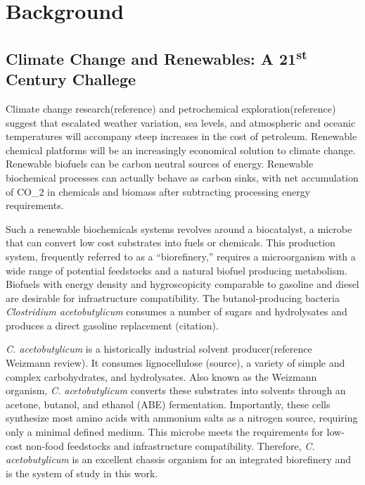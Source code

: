 
\chapter{Background}

\section{Climate Change and Renewables: A 21\textsuperscript{st} Century Challege}
Climate change research(reference) and petrochemical exploration(reference) suggest that escalated weather variation, sea levels, and atmospheric and oceanic temperatures will accompany steep increases in the cost of petroleum. Renewable chemical platforms will be an increasingly economical solution to climate change. Renewable biofuels can be carbon neutral sources of energy. Renewable biochemical processes can actually behave as carbon sinks, with net accumulation of CO_2 in chemicals and biomass after subtracting processing energy requirements.

Such a renewable biochemicals systems revolves around a biocatalyst, a microbe that can convert low cost substrates into fuels or chemicals. This production system, frequently referred to as a ``biorefinery,'' requires a microorganism with a wide range of potential feedstocks and a natural biofuel producing metabolism. Biofuels with energy density and hygroscopicity comparable to gasoline and diesel are desirable for infrastructure compatibility. The butanol-producing bacteria \textit{Clostridium acetobutylicum} consumes a number of sugars and hydrolysates and produces a direct gasoline replacement (citation).

\textit{C. acetobutylicum} is a historically industrial solvent producer(reference Weizmann review). It consumes lignocellulose (source), a variety of simple and complex carbohydrates, and hydrolysates. Also known as the Weizmann organism, \textit{C. acetobutylicum} converts these substrates into solvents through an acetone, butanol, and ethanol (ABE) fermentation.  Importantly, these cells synthesize most amino acids with ammonium salts as a nitrogen source, requiring only a minimal defined medium. This microbe meets the requirements for low-cost non-food feedstocks and infrastructure compatibility. Therefore, \textit{C. acetobutylicum} is an excellent chassis organism for an integrated biorefinery and is the system of study in this work.

